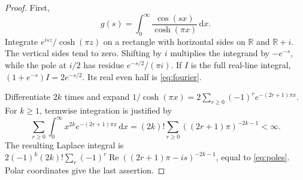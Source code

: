\documentclass[11pt,letterpaper]{article}
\numberwithin{equation}{section}
\newcommand{\RePart}{\operatorname{Re}}
\newcommand{\dd}{\,\mathrm d}
\begin{document}
\begin{proof}
First,
\begin{equation}\label{eq:fourier}
 g(s)=\int_0^\infty\frac{\cos(sx)}{\cosh(\pi x)}\dd x.
\end{equation}
Integrate $e^{isz}/\cosh(\pi z)$ on a rectangle with horizontal sides on $\mathbb R$ and $\mathbb R+i$. The vertical sides tend to zero. Shifting by $i$ multiplies the integrand by $-e^{-s}$, while the pole at $i/2$ has residue $e^{-s/2}/(\pi i)$. If $I$ is the full real-line integral, $(1+e^{-s})I=2e^{-s/2}$. Its real even half is \eqref{eq:fourier}.

Differentiate $2k$ times and expand $1/\cosh(\pi x)=2\sum_{r\ge0}(-1)^re^{-(2r+1)\pi x}$. For $k\ge1$, termwise integration is justified by
\[
 \sum_{r\ge0}\int_0^\infty x^{2k}e^{-(2r+1)\pi x}\dd x
 =(2k)!\sum_{r\ge0}((2r+1)\pi)^{-2k-1}<\infty.
\]
The resulting Laplace integral is
$2(-1)^k(2k)!\sum_r(-1)^r\RePart((2r+1)\pi-is)^{-2k-1}$, equal to \eqref{eq:poles}. Polar coordinates give the last assertion.
\end{proof}
\end{document}
